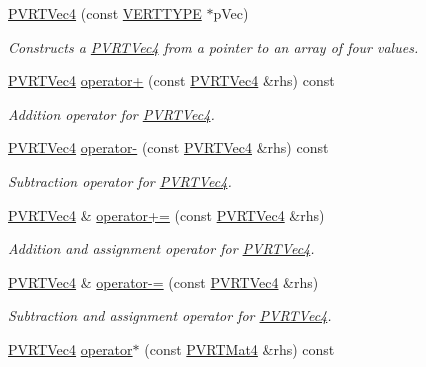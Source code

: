 \begin{DoxyCompactItemize}
\hyperlink{struct_p_v_r_t_vec4_a7281ce99a21db8a51651ad8991e418b8}{P\+V\+R\+T\+Vec4} (const \hyperlink{group___a_p_i___o_g_l_e_s_ga06da457b7d3e93368ab904f89e1396be}{V\+E\+R\+T\+T\+Y\+P\+E} $\ast$p\+Vec)
\begin{DoxyCompactList}\small\item\em Constructs a \hyperlink{struct_p_v_r_t_vec4}{P\+V\+R\+T\+Vec4} from a pointer to an array of four values. \end{DoxyCompactList}\item 
\hyperlink{struct_p_v_r_t_vec4}{P\+V\+R\+T\+Vec4} \hyperlink{struct_p_v_r_t_vec4_a2a22d9d2d1acaa3113827b658605d15e}{operator+} (const \hyperlink{struct_p_v_r_t_vec4}{P\+V\+R\+T\+Vec4} \&rhs) const 
\begin{DoxyCompactList}\small\item\em Addition operator for \hyperlink{struct_p_v_r_t_vec4}{P\+V\+R\+T\+Vec4}. \end{DoxyCompactList}\item 
\hyperlink{struct_p_v_r_t_vec4}{P\+V\+R\+T\+Vec4} \hyperlink{struct_p_v_r_t_vec4_a222ce3c0f8144dcc5d929b03d29841fc}{operator-\/} (const \hyperlink{struct_p_v_r_t_vec4}{P\+V\+R\+T\+Vec4} \&rhs) const 
\begin{DoxyCompactList}\small\item\em Subtraction operator for \hyperlink{struct_p_v_r_t_vec4}{P\+V\+R\+T\+Vec4}. \end{DoxyCompactList}\item 
\hyperlink{struct_p_v_r_t_vec4}{P\+V\+R\+T\+Vec4} \& \hyperlink{struct_p_v_r_t_vec4_a71e1a032d1bb31a375c431a74e1bc760}{operator+=} (const \hyperlink{struct_p_v_r_t_vec4}{P\+V\+R\+T\+Vec4} \&rhs)
\begin{DoxyCompactList}\small\item\em Addition and assignment operator for \hyperlink{struct_p_v_r_t_vec4}{P\+V\+R\+T\+Vec4}. \end{DoxyCompactList}\item 
\hyperlink{struct_p_v_r_t_vec4}{P\+V\+R\+T\+Vec4} \& \hyperlink{struct_p_v_r_t_vec4_a67776491287ce82559a0f740e154f058}{operator-\/=} (const \hyperlink{struct_p_v_r_t_vec4}{P\+V\+R\+T\+Vec4} \&rhs)
\begin{DoxyCompactList}\small\item\em Subtraction and assignment operator for \hyperlink{struct_p_v_r_t_vec4}{P\+V\+R\+T\+Vec4}. \end{DoxyCompactList}\item 
\hyperlink{struct_p_v_r_t_vec4}{P\+V\+R\+T\+Vec4} \hyperlink{struct_p_v_r_t_vec4_a1b40a3bb98382a854220e80f28960814}{operator$\ast$} (const \hyperlink{struct_p_v_r_t_mat4}{P\+V\+R\+T\+Mat4} \&rhs) const 

\end{DoxyCompactItemize}
